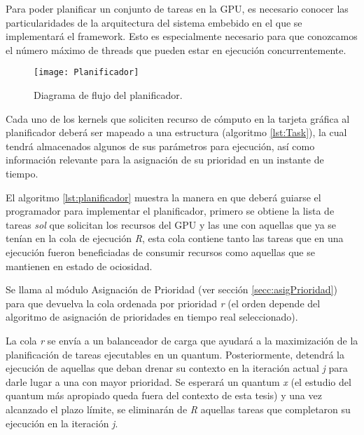 

Para poder planificar un conjunto de tareas en la GPU, es necesario conocer las particularidades de la arquitectura del sistema embebido en el que se implementará el framework. Esto es especialmente necesario para que conozcamos el número máximo de threads que pueden estar en ejecución concurrentemente.
\newline

    \begin{figure}[!]
      \centering
        \texttt{[image: Planificador]}
        \caption{Diagrama de flujo del planificador.}
        \label{fig:Planificador}
    \end{figure}

Cada uno de los kernels que soliciten recurso de cómputo en la tarjeta gráfica al planificador deberá ser mapeado a una estructura (algoritmo \ref{lst:Task}), la cual tendrá almacenados algunos de sus parámetros para ejecución, así como información relevante para la asignación de su prioridad en un instante de tiempo.
\newline

El algoritmo \ref{lst:planificador} muestra la manera en que deberá guiarse el programador para implementar el planificador, primero se obtiene la lista de tareas \textit{sol} que solicitan los recursos del GPU y las une con aquellas que ya se tenían en la cola de ejecución \textit{R}, esta cola contiene tanto las tareas que en una ejecución fueron beneficiadas de consumir recursos como aquellas que se mantienen en estado de ociosidad.
\newline

Se llama al módulo Asignación de Prioridad (ver sección \ref{secc:asigPrioridad}) para que devuelva la cola ordenada por prioridad \textit{r} (el orden depende del algoritmo de asignación de prioridades en tiempo real seleccionado).

La cola \textit{r} se envía a un balanceador de carga que ayudará a la maximización de la planificación de tareas ejecutables en un quantum. Posteriormente, detendrá la ejecución de aquellas que deban drenar su contexto en la iteración actual \textit{j} para darle lugar a una con mayor prioridad.
Se esperará un quantum \textit{x} (el estudio del quantum más apropiado queda fuera del contexto de esta tesis) y una vez alcanzado el plazo límite, se eliminarán de \textit{R} aquellas tareas que completaron su ejecución en la iteración \textit{j}. 

